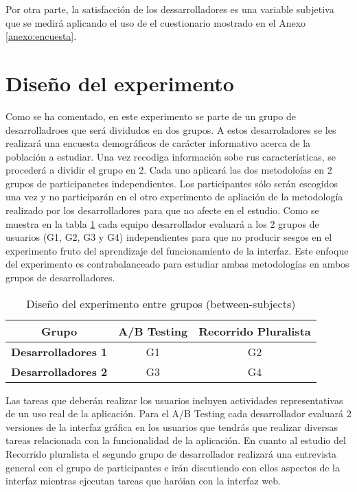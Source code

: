 \documentclass[a4paper,12pt]{report}
\begin{document}
Por otra parte, la satisfacción de los dessarrolladores es una variable subjetiva que se medirá aplicando el uso de el cuestionario mostrado en el Anexo \ref{anexo:encuesta}. 

\section{Diseño del experimento}
Como se ha comentado, en este experimento se parte de un grupo de desarrolladroes que será dividudos en dos grupos. A estos desarroladores se les realizará una encuesta demográficos de carácter informativo acerca de la población a estudiar. Una vez recodiga información sobe rus características, se procederá a dividir el grupo en 2. Cada uno aplicará las dos metodoloías en 2 grupos de participanetes independientes. Los participantes sólo serán escogidos una vez y no participarán en el otro experimento de apliación de la metodología realizado por los desarrolladores para que no afecte en el estudio. Como se muestra en la tabla \ref{tab:diseño_experimento} cada equipo desarrollador evaluará a los 2 grupos de usuarios (G1, G2, G3 y G4) independientes para que no producir sesgos en el experimento fruto del aprendizaje del funcionamiento de la interfaz. Este enfoque del experimento es contrabalanceado para estudiar ambas metodologías en ambos grupos de desarrolladores.

\begin{table}[h]
\centering
\begin{tabular}{|c|c|c|}
\hline
\textbf{Grupo} & \textbf{A/B Testing} & \textbf{Recorrido Pluralista} \\ \hline
\textbf{Desarrolladores 1} & G1 & G2 \\ \hline
\textbf{Desarrolladores 2} & G3 & G4 \\ \hline
\end{tabular}
\caption{Diseño del experimento entre grupos (between-subjects)}
\label{tab:diseño_experimento}
\end{table}

Las tareas que deberán realizar los usuarios incluyen actividades representativas de un uso real de la aplicación. Para el A/B Testing cada desarrollador evaluará 2 versiones de la interfaz gráfica en los usuarios que tendrás que realizar diversas tareas relacionada con la funcionalidad de la aplicación. En cuanto al estudio del Recorrido pluralista el segundo grupo de desarrollador realizará una entrevista general con el grupo de participantes e irán discutiendo con ellos aspectos de la interfaz mientras ejecutan tareas que haróian con la interfaz web.
\end{document}

